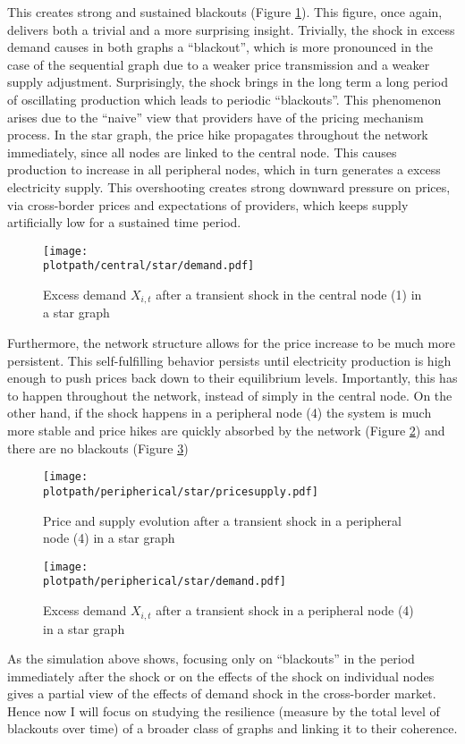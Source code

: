 This creates strong and sustained blackouts (Figure \ref{fig:demandtransshockcen_star}). This figure, once again, delivers both a trivial and a more surprising insight. Trivially, the shock in excess demand causes in both graphs a ``blackout'', which is more pronounced in the case of the sequential graph due to a weaker price transmission and a weaker supply adjustment. Surprisingly, the shock brings in the long term a long period of oscillating production which leads to periodic ``blackouts''. This phenomenon arises due to the ``naive'' view that providers have of the pricing mechanism process. In the star graph, the price hike propagates throughout the network immediately, since all nodes are linked to the central node. This causes production to increase in all peripheral nodes, which in turn generates a excess electricity supply. This overshooting creates strong downward pressure on prices, via cross-border prices and expectations of providers, which keeps supply artificially low for a sustained time period.

\begin{figure}[H]
    \centering
    \texttt{[image: \\plotpath/central/star/demand.pdf]}
    \caption{Excess demand $X_{i, t}$ after a transient shock in the central node (1) in a star graph} \label{fig:demandtransshockcen_star}
\end{figure}

Furthermore, the network structure allows for the price increase to be much more persistent. This self-fulfilling behavior persists until electricity production is high enough to push prices back down to their equilibrium levels. Importantly, this has to happen throughout the network, instead of simply in the central node. On the other hand, if the shock happens in a peripheral node (4) the system is much more stable and price hikes are quickly absorbed by the network (Figure \ref{fig:transshockper_star}) and there are no blackouts (Figure \ref{fig:demandtransshockper_star})

\begin{figure}[H]
    \centering
    \texttt{[image: \\plotpath/peripherical/star/pricesupply.pdf]}
    \caption{Price and supply evolution after a transient shock in a peripheral node (4) in a star graph} \label{fig:transshockper_star}
\end{figure}

\begin{figure}[H]
    \centering
    \texttt{[image: \\plotpath/peripherical/star/demand.pdf]}
    \caption{Excess demand $X_{i, t}$ after a transient shock in a peripheral node (4) in a star graph} \label{fig:demandtransshockper_star}
\end{figure}


As the simulation above shows, focusing only on ``blackouts'' in the period immediately after the shock or on the effects of the shock on individual nodes gives a partial view of the effects of demand shock in the cross-border market. Hence now I will focus on studying the resilience (measure by the total level of blackouts over time) of a broader class of graphs and linking it to their coherence.


